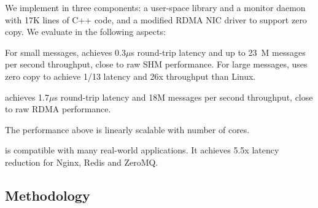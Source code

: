 
We implement \sys in three components: a user-space library \libipc{} and a monitor daemon with 17K lines of C++ code, and a modified RDMA NIC driver to support zero copy. We evaluate \sys in the following aspects:

For small messages, \sys achieves 0.3$\mu$s round-trip latency and up to 23~M messages per second throughput, close to raw SHM performance. For large messages, \sys uses zero copy to achieve 1/13 latency and 26x throughput than Linux.

\sys achieves 1.7$\mu$s round-trip latency and 18M messages per second throughput, close to raw RDMA performance.


The performance above is linearly scalable with number of cores. %


\sys{} is compatible with many real-world applications.
It achieves 5.5x latency reduction for Nginx, Redis and ZeroMQ.


\subsection{Methodology}
\label{subsec:methodology}

